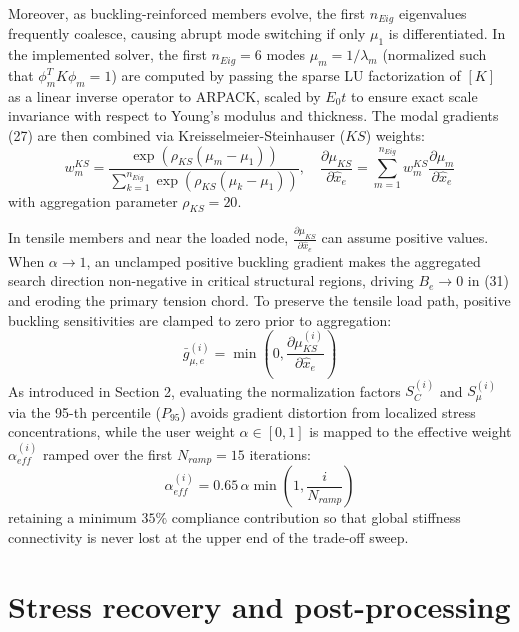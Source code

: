 \documentclass{article}
\begin{document}
Moreover, as buckling-reinforced members evolve, the first $n_{Eig}$ eigenvalues frequently coalesce, causing abrupt mode switching if only $\mu_1$ is differentiated. In the implemented solver, the first $n_{Eig} = 6$ modes $\mu_m = 1/\lambda_m$ (normalized such that $\phi_m^T K \phi_m = 1$) are computed by passing the sparse LU factorization of $[K]$ as a linear inverse operator to ARPACK, scaled by $E_0 t$ to ensure exact scale invariance with respect to Young's modulus and thickness. The modal gradients (27) are then combined via Kreisselmeier-Steinhauser ($KS$) weights:
\begin{equation}
w_m^{KS} = \frac{\exp\left(\rho_{KS}(\mu_m - \mu_1)\right)}{\sum_{k=1}^{n_{Eig}} \exp\left(\rho_{KS}(\mu_k - \mu_1)\right)}, \quad \frac{\partial \mu_{KS}}{\partial \hat{x}_e} = \sum_{m=1}^{n_{Eig}} w_m^{KS} \frac{\partial \mu_m}{\partial \hat{x}_e}
\end{equation}
with aggregation parameter $\rho_{KS} = 20$.

In tensile members and near the loaded node, $\frac{\partial \mu_{KS}}{\partial \hat{x}_e}$ can assume positive values. When $\alpha \rightarrow 1$, an unclamped positive buckling gradient makes the aggregated search direction non-negative in critical structural regions, driving $B_e \rightarrow 0$ in (31) and eroding the primary tension chord. To preserve the tensile load path, positive buckling sensitivities are clamped to zero prior to aggregation:
\begin{equation}
\bar{g}_{\mu, e}^{(i)} = \min\left(0, \frac{\partial \mu_{KS}^{(i)}}{\partial \hat{x}_e}\right)
\end{equation}
As introduced in Section 2, evaluating the normalization factors $S_C^{(i)}$ and $S_\mu^{(i)}$ via the 95-th percentile ($P_{95}$) avoids gradient distortion from localized stress concentrations, while the user weight $\alpha \in [0, 1]$ is mapped to the effective weight $\alpha_{eff}^{(i)}$ ramped over the first $N_{ramp} = 15$ iterations:
\begin{equation}
\alpha_{eff}^{(i)} = 0.65\,\alpha \min\left(1, \frac{i}{N_{ramp}}\right)
\end{equation}
retaining a minimum $35\%$ compliance contribution so that global stiffness connectivity is never lost at the upper end of the trade-off sweep.

\section{Stress recovery and post-processing}
\end{document}

